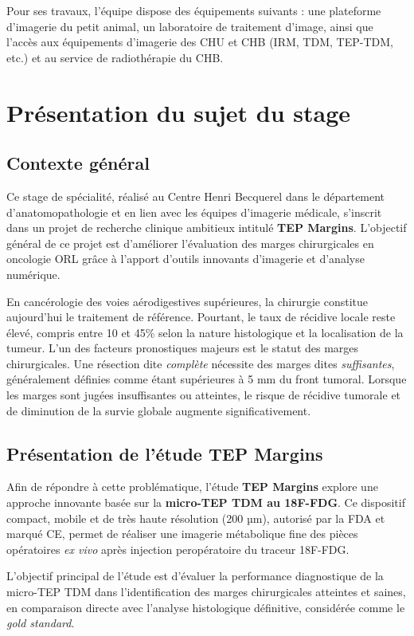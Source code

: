 \documentclass[12pt,a4paper]{report}
\let\oldchapter\chapter
\renewcommand{\chapter}{\clearpage\oldchapter}
\begin{document}
Pour ses travaux, l'équipe dispose des équipements suivants : une plateforme d'imagerie du petit animal, un laboratoire de traitement d'image, ainsi que l'accès aux équipements d'imagerie des CHU et CHB (IRM, TDM, TEP-TDM, etc.) et au service de radiothérapie du CHB.

\chapter{Présentation du sujet du stage}

\section{Contexte général}

Ce stage de spécialité, réalisé au Centre Henri Becquerel dans le département d'anatomopathologie et en lien avec les équipes d'imagerie médicale, s'inscrit dans un projet de recherche clinique ambitieux intitulé \textbf{TEP Margins}. L'objectif général de ce projet est d'améliorer l'évaluation des marges chirurgicales en oncologie ORL grâce à l'apport d'outils innovants d'imagerie et d'analyse numérique.

En cancérologie des voies aérodigestives supérieures, la chirurgie constitue aujourd'hui le traitement de référence. Pourtant, le taux de récidive locale reste élevé, compris entre 10 et 45\% selon la nature histologique et la localisation de la tumeur. L'un des facteurs pronostiques majeurs est le statut des marges chirurgicales. Une résection dite \textit{complète} nécessite des marges dites \textit{suffisantes}, généralement définies comme étant supérieures à 5 mm du front tumoral. Lorsque les marges sont jugées insuffisantes ou atteintes, le risque de récidive tumorale et de diminution de la survie globale augmente significativement.

\section{Présentation de l'étude TEP Margins}

Afin de répondre à cette problématique, l'étude \textbf{TEP Margins} explore une approche innovante basée sur la \textbf{micro-TEP TDM au 18F-FDG}. Ce dispositif compact, mobile et de très haute résolution (200 µm), autorisé par la FDA et marqué CE, permet de réaliser une imagerie métabolique fine des pièces opératoires \textit{ex vivo} après injection peropératoire du traceur 18F-FDG.

L'objectif principal de l'étude est d'évaluer la performance diagnostique de la micro-TEP TDM dans l'identification des marges chirurgicales atteintes et saines, en comparaison directe avec l'analyse histologique définitive, considérée comme le \textit{gold standard}.
\end{document}
